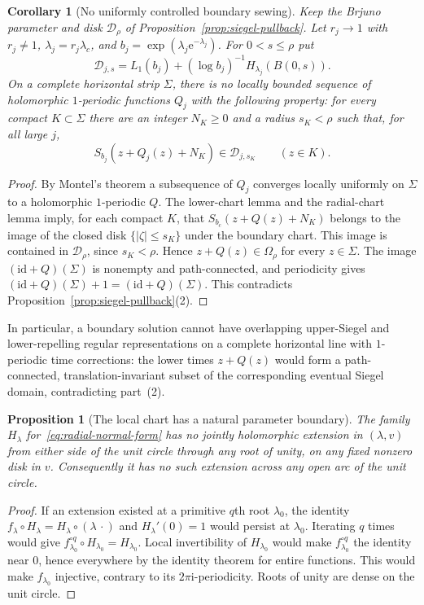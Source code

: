 \documentclass[11pt]{amsart}
\newtheorem{proposition}[theorem]{Proposition}
\newtheorem{corollary}[theorem]{Corollary}
\theoremstyle{definition}
\newcommand{\eee}{\mathrm{e}}
\newcommand{\ii}{\mathrm{i}}
\begin{document}
\begin{corollary}[No uniformly controlled boundary sewing]
\label{cor:no-uniform-sewing}
Keep the Brjuno parameter and disk $\mathcal D_\rho$ of
Proposition~\ref{prop:siegel-pullback}.  Let $r_j\to1$ with $r_j\ne1$,
$\lambda_j=r_j\lambda_c$, and
$b_j=\exp(\lambda_j\eee^{-\lambda_j})$.  For $0<s\le\rho$ put
\[
 \mathcal D_{j,s}=L_1(b_j)+(\log b_j)^{-1}H_{\lambda_j}(B(0,s)).
\]
On a complete horizontal strip $\Sigma$, there is no locally bounded
sequence of holomorphic $1$-periodic functions $Q_j$ with the following
property: for every compact $K\subset\Sigma$ there are an integer
$N_K\ge0$ and a radius $s_K<\rho$ such that, for all large $j$,
\[
 S_{b_j}(z+Q_j(z)+N_K)\in\mathcal D_{j,s_K}
 \qquad(z\in K).
\]
\end{corollary}

\begin{proof}
By Montel's theorem a subsequence of $Q_j$ converges locally uniformly
on $\Sigma$ to a holomorphic $1$-periodic $Q$.  The lower-chart lemma and
the radial-chart lemma imply, for each compact $K$, that
$S_{b_c}(z+Q(z)+N_K)$ belongs to the image of the closed disk
$\{|\zeta|\le s_K\}$ under the boundary chart.  This image is contained
in $\mathcal D_\rho$, since $s_K<\rho$.  Hence
$z+Q(z)\in\Omega_\rho$ for every $z\in\Sigma$.
The image $(\mathrm{id}+Q)(\Sigma)$ is nonempty and path-connected, and
periodicity gives $(\mathrm{id}+Q)(\Sigma)+1=(\mathrm{id}+Q)(\Sigma)$.
This contradicts Proposition~\ref{prop:siegel-pullback}(2).
\end{proof}

In particular, a boundary solution cannot have overlapping upper-Siegel
and lower-repelling regular representations on a complete horizontal
line with $1$-periodic time corrections: the lower times
$z+Q(z)$ would form a path-connected, translation-invariant subset of
the corresponding eventual Siegel domain, contradicting part~(2).

\begin{proposition}[The local chart has a natural parameter boundary]
\label{prop:chart-boundary}
The family $H_\lambda$ for~\eqref{eq:radial-normal-form} has no jointly
holomorphic extension in $(\lambda,v)$ from either side of the unit circle
through any root of unity, on any fixed nonzero disk in $v$.  Consequently
it has no such extension across any open arc of the unit circle.
\end{proposition}

\begin{proof}
If an extension existed at a primitive $q$th root $\lambda_0$, the
identity $f_\lambda\circ H_\lambda=H_\lambda\circ(\lambda\,\cdot)$
and $H_\lambda'(0)=1$ would persist at $\lambda_0$.  Iterating $q$ times
would give $f_{\lambda_0}^{\circ q}\circ H_{\lambda_0}=H_{\lambda_0}$.
Local invertibility of $H_{\lambda_0}$ would make
$f_{\lambda_0}^{\circ q}$ the identity near $0$, hence everywhere by the
identity theorem for entire functions.  This would make $f_{\lambda_0}$
injective, contrary to its $2\pi\ii$-periodicity.  Roots of unity are dense
on the unit circle.
\end{proof}
\end{document}
